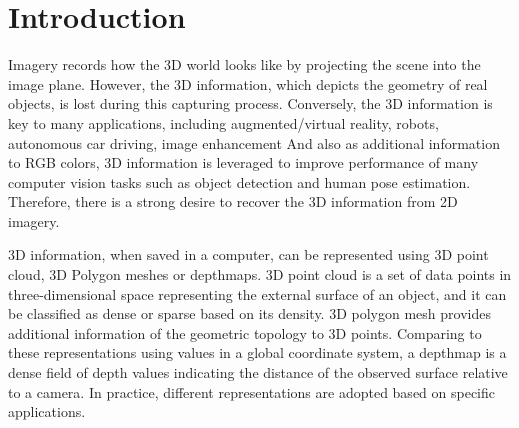 \chapter{Introduction}


Imagery records how the 3D world looks like by projecting the scene into the image plane. 
However, the 3D information, which depicts the geometry of real objects, is lost during this capturing process. Conversely, the 3D information is key to many applications, including augmented/virtual reality, robots, autonomous car driving, image enhancement \etc 
And also as additional information to RGB colors, 3D information is leveraged to improve performance of many computer vision tasks such as object detection and human pose estimation. Therefore, there is a strong desire to recover the 3D information from 2D imagery.

3D information, when saved in a computer, can be represented using 3D point cloud, 3D Polygon meshes or depthmaps. 3D point cloud is a set of data points in three-dimensional space representing the external surface of an object, and it can be classified as dense or sparse based on its density. 3D polygon mesh provides additional information of the geometric topology to 3D points. Comparing to these representations using values in a global coordinate system, a depthmap is a dense field of depth values indicating the distance of the observed surface relative to a camera. In practice, different representations are adopted based on specific applications. 

